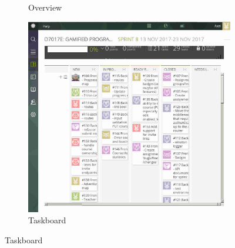 \begin{figure}[hb]
\begin{subfigure}{.3\textwidth}
        \caption{Overview}
    \end{subfigure}
    \hfill
    \begin{subfigure}{.3\textwidth}
        \includegraphics[width=\textwidth]{img/taiga_taskboard.jpg}
        \caption{Taskboard}
    \end{subfigure}
\end{figure}

